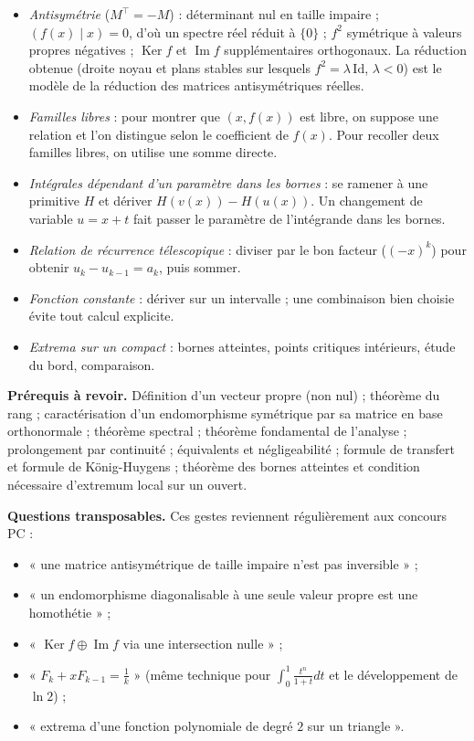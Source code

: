 \documentclass[11pt,a4paper]{article}
\providecommand{\tightlist}{\setlength{\itemsep}{0pt}\setlength{\parskip}{0pt}}
\begin{document}
\begin{itemize}
\tightlist
\item
  \emph{Antisymétrie} (\(M^\top=-M\)) : déterminant nul en taille impaire ; \((f(x)\mid x)=0\), d'où un spectre réel réduit à \(\{0\}\) ; \(f^2\) symétrique à valeurs propres négatives ; \(\operatorname{Ker}f\) et \(\operatorname{Im}f\) supplémentaires orthogonaux.
  La réduction obtenue (droite noyau et plans stables sur lesquels \(f^2=\lambda\,\mathrm{Id}\), \(\lambda<0\)) est le modèle de la réduction des matrices antisymétriques réelles.
\item
  \emph{Familles libres} : pour montrer que \((x,f(x))\) est libre, on suppose une relation et l'on distingue selon le coefficient de \(f(x)\). Pour recoller deux familles libres, on utilise une somme directe.
\item
  \emph{Intégrales dépendant d'un paramètre dans les bornes} : se ramener à une primitive \(H\) et dériver \(H(v(x))-H(u(x))\). Un changement de variable \(u=x+t\) fait passer le paramètre de l'intégrande dans les bornes.
\item
  \emph{Relation de récurrence télescopique} : diviser par le bon facteur (\((-x)^k\)) pour obtenir \(u_k-u_{k-1}=a_k\), puis sommer.
\item
  \emph{Fonction constante} : dériver sur un intervalle ; une combinaison bien choisie évite tout calcul explicite.
\item
  \emph{Extrema sur un compact} : bornes atteintes, points critiques intérieurs, étude du bord, comparaison.
\end{itemize}

\textbf{Prérequis à revoir.} Définition d'un vecteur propre (non nul) ; théorème du rang ; caractérisation d'un endomorphisme symétrique par sa matrice en base orthonormale ; théorème spectral ; théorème fondamental de l'analyse ; prolongement par continuité ; équivalents et négligeabilité ; formule de transfert et formule de König-Huygens ; théorème des bornes atteintes et condition nécessaire d'extremum local sur un ouvert.

\textbf{Questions transposables.} Ces gestes reviennent régulièrement aux concours PC :

\begin{itemize}
\tightlist
\item
  « une matrice antisymétrique de taille impaire n'est pas inversible » ;
\item
  « un endomorphisme diagonalisable à une seule valeur propre est une homothétie » ;
\item
  « \(\operatorname{Ker}f\oplus\operatorname{Im}f\) via une intersection nulle » ;
\item
  « \(F_k+xF_{k-1}=\frac1k\) » (même technique pour \(\int_0^1\frac{t^n}{1+t}dt\) et le développement de \(\ln2\)) ;
\item
  « extrema d'une fonction polynomiale de degré \(2\) sur un triangle ».
\end{itemize}
\end{document}
